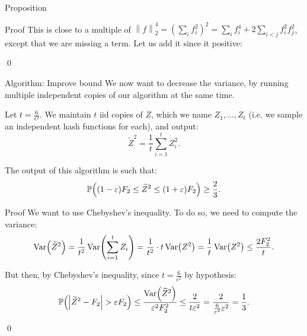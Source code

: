 \documentclass[a4paper]{article}
\begin{document}
\begin{parag}{Proposition}
\begin{subparag}{Proof}
        This is close to a multiple of $\left\|f\right\|_2^4 = \left(\sum_{i} f_i^2\right)^2 = \sum_{i} f_i^4 + 2\sum_{i< j} f_i^2 f_j^2$, except that we are missing a term. Let us add it since it positive:

        \qed
    \end{subparag}
\end{parag}

\begin{parag}{Algorithm: Improve bound}
    We now want to decrease the variance, by running multiple independent copies of our algorithm at the same time. 

    Let $t = \frac{6}{\epsilon^2}$. We maintain $t$ iid copies of $Z$, which we name $Z_1, \ldots, Z_t$ (i.e. we sample an independent hash functions for each), and output: 
    \[\widetilde{Z}^2 = \frac{1}{t} \sum_{i=1}^{t} Z_i^2.\]

    The output of this algorithm is such that:
    \[\prob\left(\left(1 - \epsilon\right) F_2 \leq \widetilde{Z}^2 \leq \left(1+\epsilon\right)F_2\right) \geq \frac{2}{3}.\]

    \begin{subparag}{Proof}
        We want to use Chebyshev's inequality. To do so, we need to compute the variance: 
        \[\Var\left(\widetilde{Z}^2\right) = \frac{1}{t^2} \Var\left(\sum_{i=1}^{t} Z_i\right) = \frac{1}{t^2} \cdot t \Var\left(Z^2\right) = \frac{1}{t} \Var\left(Z^2\right) \leq \frac{2 F_2^2}{t}.\]

        But then, by Chebyshev's inequality, since $t = \frac{6}{\epsilon^2}$ by hypothesis: 
        \[\prob\left(\left|\widetilde{Z}^2 - F_2\right| > \epsilon F_2\right) \leq \frac{\Var\left(\widetilde{Z}^2\right)}{\epsilon^2 F_2^2} \leq \frac{2}{t \epsilon^2} = \frac{2}{\frac{6}{\epsilon^2} \epsilon^2} = \frac{1}{3}.\]
        
        \qed
    \end{subparag}
\end{parag}
\end{document}
